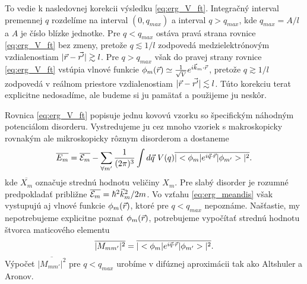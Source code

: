 To vedie k nasledovnej korekcii výsledku \eqref{eq:erg_V_ft}. Integračný interval premennej $q$ rozdelíme na interval $(0, q_{max})$ a interval $q > q_{max}$, kde $q_{max}=A/l$ a $A$ je číslo blízke jednotke.
Pre $q < q_{max}$ ostáva pravá strana rovnice \eqref{eq:erg_V_ft} bez zmeny, pretože $q \lesssim 1/l$ zodpovedá medzielektrónovým vzdialenostiam $|\vec{r}-\vec{r'}| \gtrsim l$.
Pre $q > q_{max}$  však do pravej strany rovnice \eqref{eq:erg_V_ft} vstúpia vlnové funkcie $\phi_m(\vec{r}) \simeq \frac{1}{\sqrt V}e^{i\vec{k}_m\cdot\vec{r}}$, pretože $q \gtrsim 1/l$
zodpovedá v reálnom priestore vzdialenostiam $|\vec{r}-\vec{r'}| \lesssim l$. Túto korekciu terat explicitne nedosadíme, ale budeme si ju pamätať a použijeme ju neskôr.

Rovnica \eqref{eq:erg_V_ft} popisuje jednu kovovú vzorku so špecifickým náhodným potenciálom disorderu. Vystredujeme ju cez mnoho vzoriek s makroskopicky rovnakým ale mikroskopicky rôznym disorderom a dostaneme
\begin{equation}
\label{eq:erg_meandis}
 \overline{E_m}=\overline{\mathcal{E}_m}-\sum_{\forall m'} \frac{1}{(2\pi)^{3}} \int d\vec{q}\ V(q) \overline{|<\phi_m|e^{i\vec{q}\cdot\vec{r}}|\phi_{m'}>|^2} \text{.}
\end{equation}
kde $\overline{X_m}$ označuje strednú hodnotu veličiny $X_m$. Pre slabý disorder je rozumné predpokladať približne $\overline{\mathcal{E}_m} = \hbar^2 \vec{k}_m^2/2m$.
Vo vzťahu \eqref{eq:erg_meandis} však vystupujú aj vlnové funkcie
$\phi_m(\vec{r})$, ktoré pre $q < q_{max}$ nepoznáme. Našťastie, my nepotrebujeme explicitne poznať $\phi_m(\vec{r})$, potrebujeme vypočítať strednú hodnotu štvorca maticového elementu
\begin{equation}
\label{eq:aa_matrix_element}
\overline{| M_{mm'}|^2} =\overline{|<\phi_m|e^{i\vec{q}\cdot\vec{r}}|\phi_{m'}>|^2} \text{.}
\end{equation}
Výpočet $\overline{| M_{mm'}|^2}$ pre $q < q_{max}$ urobíme v difúznej aproximácii tak ako Altshuler a Aronov.

